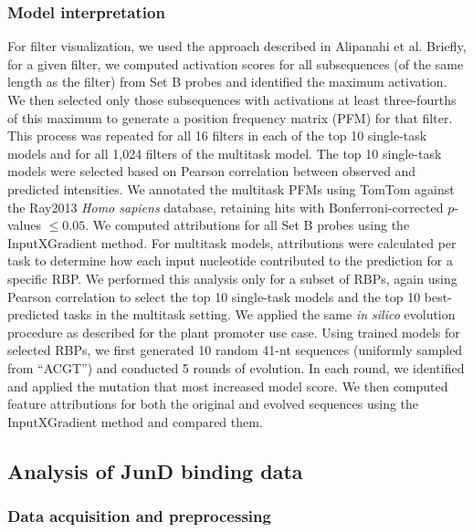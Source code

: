 \subsubsection{Model interpretation}

For filter visualization, we used the approach described in Alipanahi et al. Briefly, for a given filter, we computed activation scores for all subsequences (of the same length as the filter) from Set B probes and identified the maximum activation. We then selected only those subsequences with activations at least three-fourths of this maximum to generate a position frequency matrix (PFM) for that filter. This process was repeated for all 16 filters in each of the top 10 single-task models and for all 1,024 filters of the multitask model. The top 10 single-task models were selected based on Pearson correlation between observed and predicted intensities. We annotated the multitask PFMs using TomTom against the Ray2013 \textit{Homo sapiens} database, retaining hits with Bonferroni-corrected $p$-values $\leq 0.05$. We computed attributions for all Set B probes using the InputXGradient method\cite{Shrikumar2016-lf}. For multitask models, attributions were calculated per task to determine how each input nucleotide contributed to the prediction for a specific RBP. We performed this analysis only for a subset of RBPs, again using Pearson correlation to select the top 10 single-task models and the top 10 best-predicted tasks in the multitask setting. We applied the same \textit{in silico} evolution procedure as described for the plant promoter use case. Using trained models for selected RBPs, we first generated 10 random 41-nt sequences (uniformly sampled from ``ACGT'') and conducted 5 rounds of evolution. In each round, we identified and applied the mutation that most increased model score. We then computed feature attributions for both the original and evolved sequences using the InputXGradient method and compared them.

\subsection{Analysis of JunD binding data}

\subsubsection{Data acquisition and preprocessing}

